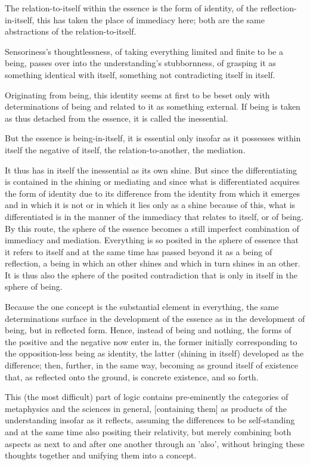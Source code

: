 The relation-to-itself within the essence is the form of identity,
of the reflection-in-itself, this has taken the place of immediacy here;
both are the same abstractions of the relation-to-itself.

    Sensoriness's thoughtlessness,
    of taking everything limited and finite to be a being,
    passes over into the understanding's stubbornness,
    of grasping it as something identical with itself,
    something not contradicting itself in itself.

Originating from being, this identity seems at first to be beset only with
determinations of being and related to it as something external.
If being is taken as thus detached from the essence,
it is called the inessential.

But the essence is being-in-itself, it is essential only insofar as
it possesses within itself the negative of itself,
the relation-to-another, the mediation.

It thus has in itself the inessential as its own shine.
But since the differentiating is contained in the shining or mediating
and since what is differentiated acquires the form of identity due to
its difference from the identity from which it emerges and in which it is not
or in which it lies only as a shine because of this,
what is differentiated is in the manner of
the immediacy that relates to itself, or of being.
By this route, the sphere of the essence becomes a
still imperfect combination of immediacy and mediation.
Everything is so posited in the sphere of essence
that it refers to itself and at the same time
has passed beyond it as a being of reflection,
a being in which an other shines and which in turn shines in an other.
It is thus also the sphere of the posited contradiction
that is only in itself in the sphere of being.

    Because the one concept is the substantial element in everything,
    the same determinations surface in the development of the essence
    as in the development of being, but in reflected form.
    Hence, instead of being and nothing,
    the forms of the positive and the negative now enter in,
    the former initially corresponding to
    the opposition-less being as identity,
    the latter (shining in itself) developed as the difference;
    then, further, in the same way,
    becoming as ground itself of existence that,
    as reflected onto the ground, is concrete existence, and so forth.

    This (the most difficult) part of logic contains pre-eminently
    the categories of metaphysics and the sciences in general,
    [containing them] as products of the understanding insofar as it reflects,
    assuming the differences to be self-standing and
    at the same time also positing their relativity,
    but merely combining both aspects as next to
    and after one another through an 'also',
    without bringing these thoughts together
    and unifying them into a concept.

